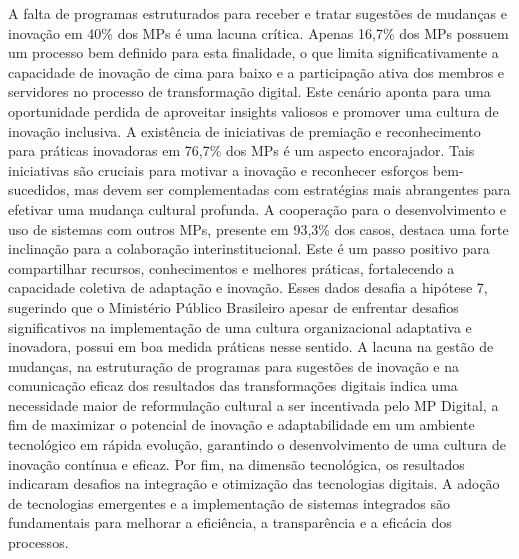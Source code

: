 A falta de programas estruturados para receber e tratar sugestões de mudanças e inovação em 40\% dos MPs é uma lacuna crítica. Apenas 16,7\% dos MPs possuem um processo bem definido para esta finalidade, o que limita significativamente a capacidade de inovação de cima para baixo e a participação ativa dos membros e servidores no processo de transformação digital. Este cenário aponta para uma oportunidade perdida de aproveitar insights valiosos e promover uma cultura de inovação inclusiva.
A existência de iniciativas de premiação e reconhecimento para práticas inovadoras em 76,7\% dos MPs é um aspecto encorajador. Tais iniciativas são cruciais para motivar a inovação e reconhecer esforços bem-sucedidos, mas devem ser complementadas com estratégias mais abrangentes para efetivar uma mudança cultural profunda.
A cooperação para o desenvolvimento e uso de sistemas com outros MPs, presente em 93,3\% dos casos, destaca uma forte inclinação para a colaboração interinstitucional. Este é um passo positivo para compartilhar recursos, conhecimentos e melhores práticas, fortalecendo a capacidade coletiva de adaptação e inovação.
Esses dados desafia a hipótese 7, sugerindo que o Ministério Público Brasileiro apesar de enfrentar desafios significativos na implementação de uma cultura organizacional adaptativa e inovadora, possui em boa medida práticas nesse sentido. A lacuna na gestão de mudanças, na estruturação de programas para sugestões de inovação e na comunicação eficaz dos resultados das transformações digitais indica uma necessidade maior de reformulação cultural a ser incentivada pelo MP Digital, a fim de  maximizar o potencial de inovação e adaptabilidade em um ambiente tecnológico em rápida evolução, garantindo o desenvolvimento de uma cultura de inovação contínua e eficaz.
Por fim, na dimensão tecnológica, os resultados indicaram desafios na integração e otimização das tecnologias digitais. A adoção de tecnologias emergentes e a implementação de sistemas integrados são fundamentais para melhorar a eficiência, a transparência e a eficácia dos processos.

